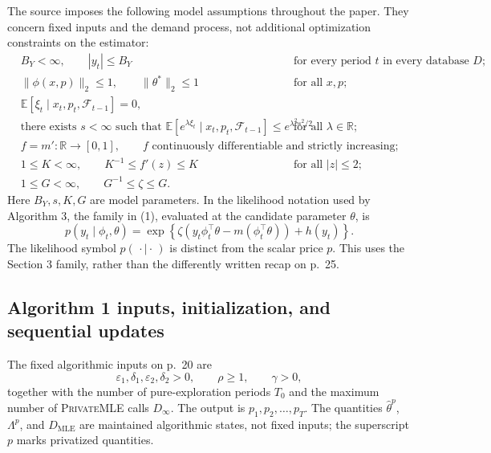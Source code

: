\documentclass{article}
\begin{document}
The source imposes the following model assumptions throughout the paper. They concern fixed inputs and the demand process, not additional optimization constraints on the estimator:
\begin{align*}
& B_Y<\infty,\qquad |y_t|\le B_Y
&&\text{for every period }t\text{ in every database }D;\\
&\|\phi(x,p)\|_2\le1,\qquad \|\theta^*\|_2\le1
&&\text{for all }x,p;\\
&\mathbb E[\xi_t\mid x_t,p_t,\mathcal F_{t-1}]=0,\\
&\text{there exists }s<\infty\text{ such that }
\mathbb E[e^{\lambda\xi_t}\mid x_t,p_t,\mathcal F_{t-1}]
\le e^{\lambda^2s^2/2}
&&\text{for all }\lambda\in\mathbb R;\\
&f=m':\mathbb R\longrightarrow[0,1],
\qquad f\text{ continuously differentiable and strictly increasing};\\
&1\le K<\infty,\qquad K^{-1}\le f'(z)\le K
&&\text{for all }|z|\le2;\\
&1\le G<\infty,\qquad G^{-1}\le\zeta\le G.
\end{align*}
Here $B_Y,s,K,G$ are model parameters. In the likelihood notation used by Algorithm 3, the family in (1), evaluated at the candidate parameter $\theta$, is
\[
p(y_t\mid\phi_t,\theta)
=\exp\!\left\{\zeta\left(y_t\phi_t^{\top}\theta
-m(\phi_t^{\top}\theta)\right)+h(y_t)\right\}.
\]
The likelihood symbol $p(\,\cdot\mid\cdot\,)$ is distinct from the scalar price $p$. This uses the Section 3 family, rather than the differently written recap on p.~25.

\subsection*{Algorithm 1 inputs, initialization, and sequential updates}
The fixed algorithmic inputs on p.~20 are
\[
\varepsilon_1,\delta_1,\varepsilon_2,\delta_2>0,
\qquad \rho\ge1,\qquad \gamma>0,
\]
together with the number of pure-exploration periods $T_0$ and the maximum number of \textsc{PrivateMLE} calls $D_\infty$. The output is $p_1,p_2,\ldots,p_T$. The quantities $\widehat\theta^p$, $\Lambda^p$, and $D_{\mathrm{MLE}}$ are maintained algorithmic states, not fixed inputs; the superscript $p$ marks privatized quantities.
\end{document}
